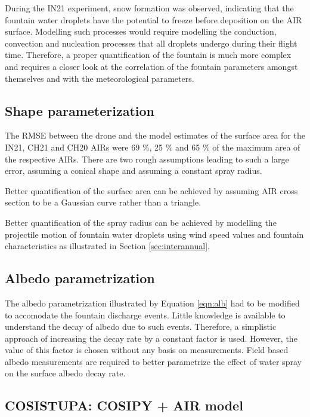 During the IN21 experiment, snow formation was observed, indicating that the fountain water droplets have the
potential to freeze before deposition on the AIR surface. Modelling such processes would require modelling the
conduction, convection and nucleation processes that all droplets undergo during their flight time. Therefore, a
proper quantification of the fountain is much more complex and requires a closer look at the correlation of the
fountain parameters amongst themselves and with the meteorological parameters.

\subsection{Shape parameterization}

The RMSE between the drone and the model estimates of the surface area for the IN21, CH21 and CH20 \ac{AIRs}
were 69 \%, 25 \% and 65 \% of the maximum area of the respective \ac{AIRs}. There are two rough assumptions
leading to such a large error, assuming a conical shape and assuming a constant spray radius.

Better quantification of the surface area can be achieved by assuming AIR cross section to be a Gaussian curve
rather than a triangle.

Better quantification of the spray radius can be achieved by modelling the projectile motion of fountain water
droplets using wind speed values and fountain characteristics as illustrated in Section \ref{sec:interannual}.


\subsection{Albedo parametrization}

The albedo parametrization illustrated by Equation \ref{eqn:alb} had to be modified to accomodate the fountain
discharge events. Little knowledge is available to understand the decay of albedo due to such events. Therefore,
a simplistic approach of increasing the decay rate by a constant factor is used. However, the value of this
factor is chosen without any basis on measurements. Field based albedo measurements are required to better
parametrize the effect of water spray on the surface albedo decay rate.

\subsection{COSISTUPA: COSIPY + AIR model}
\label{sec:Cosistupa}

